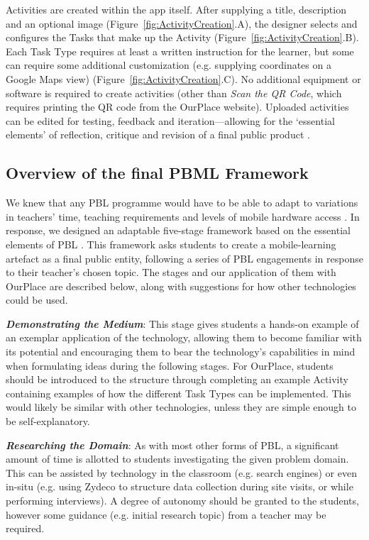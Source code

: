 \documentclass[,hyphens]{sigchi}
\begin{document}
Activities are created within the app itself. After supplying a title, description and an optional image (Figure~\ref{fig:ActivityCreation}.A), the designer selects and configures the Tasks that make up the Activity (Figure~\ref{fig:ActivityCreation}.B). Each Task Type requires at least a written instruction for the learner, but some can require some additional customization (e.g. supplying coordinates on a Google Maps view) (Figure~\ref{fig:ActivityCreation}.C). No additional equipment or software is required to create activities (other than \textit{Scan the QR Code}, which requires printing the QR code from the OurPlace website). Uploaded activities can be edited for testing, feedback and iteration---allowing for the `essential elements' of reflection, critique and revision of a final public product \cite{Larmer2015}. 

\subsection{Overview of the final PBML Framework}

We knew that any PBL programme would have to be able to adapt to variations in teachers' time, teaching requirements and levels of mobile hardware access \cite{Blumenfeld1991, Krajcik2006, InnovationUnit2016, TheEducationEndowmentFoundation2016}. In response, we designed an adaptable five-stage framework based on the essential elements of PBL \cite{Larmer2015}. This framework asks students to create a mobile-learning artefact as a final public entity, following a series of PBL engagements in response to their teacher's chosen topic. The stages and our application of them with OurPlace are described below, along with suggestions for how other technologies could be used.

\textit{\textbf{Demonstrating the Medium}}: This stage gives students a hands-on example of an exemplar application of the technology, allowing them to become familiar with its potential and encouraging them to bear the technology's capabilities in mind when formulating ideas during the following stages. For OurPlace, students should be introduced to the structure through completing an example Activity containing examples of how the different Task Types can be implemented. This would likely be similar with other technologies, unless they are simple enough to be self-explanatory.

\textit{\textbf{Researching the Domain}}: As with most other forms of PBL, a significant amount of time is allotted to students investigating the given problem domain. This can be assisted by technology in the classroom (e.g. search engines) or even in-situ (e.g. using Zydeco to structure data collection during site visits, or while performing interviews). A degree of autonomy should be granted to the students, however some guidance (e.g. initial research topic) from a teacher may be required.
\end{document}
